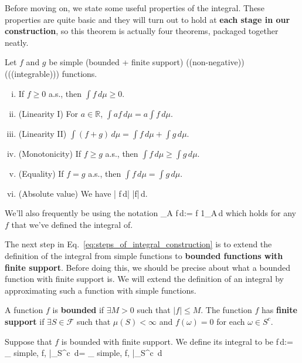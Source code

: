 Before moving on, we state some useful properties of the integral. These properties are quite basic and they will turn out to hold at \textbf{each stage in our construction}, so this theorem is actually four theorems, packaged together neatly. 
\begin{theorem}
	Let $f$ and $g$ be simple (bounded + finite support) ((non-negative)) (((integrable))) functions.
	\begin{enumerate}[i)]
		\item If $f\geq 0$ a.s., then $\int f\,d\mu\geq 0$. 
		\item (Linearity I) For $a\in\mathbb R$, $\int af\,d\mu = a\int f\,d\mu$. 
		\item (Linearity II) $\int (f + g)\,d\mu = \int f\,d\mu + \int g\,d\mu$. 
		\item (Monotonicity) If $f\geq g$ a.s., then $\int f\,d\mu\geq \int g\,d\mu$. 
		\item (Equality) If $f = g$ a.s., then $\int f\,d\mu = \int g\,d\mu$. 
		\item (Absolute value) We have
		\eq
			\left| \int f\,d\mu \right| \leq \int |f|\,d\mu.
		\qe
	\end{enumerate}
\end{theorem}
We'll also frequently be using the notation
\eq
	\int_A f\,d\mu := \int f 1_A\,d\mu
\qe
which holds for any $f$ that we've defined the integral of. 

The next step in Eq.~\eqref{eq:steps_of_integral_construction} is to extend the definition of the integral from simple functions to \textbf{bounded functions with finite support}. Before doing this, we should be precise about what a bounded function with finite support is. We will extend the definition of an integral by approximating such a function with simple functions.
\begin{definition}
	A function $f$ is \textbf{bounded} if $\exists M > 0$ such that $|f| \leq M$. The function $f$ has \textbf{finite support} if $\exists S\in\mathcal F$ such that $\mu(S) < \infty$ and $f(\omega) = 0$ for each $\omega\in S^c$. 
\end{definition}

\begin{definition}
	Suppose that $f$ is bounded with finite support. We define its integral to be
	\eq
		\int f\,d\mu := \sup_{\alpha\textnormal{ simple, }\alpha\leq f,\; \alpha|_{S^c}} \int \alpha\,d\mu = \inf_{\beta\textnormal{ simple, }f\leq \beta,\; \beta|_{S^c}} \int \alpha\,d\mu
	\qe
\end{definition}

